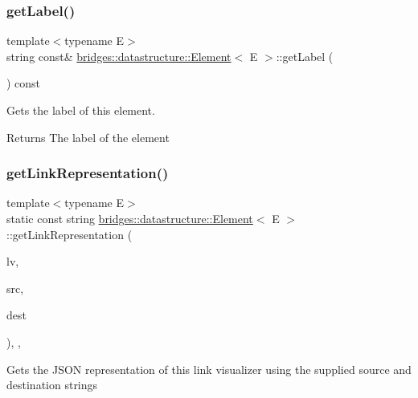 \subsubsection{\texorpdfstring{get\+Label()}{getLabel()}}
{\footnotesize\ttfamily template$<$typename E$>$ \\
string const\& \hyperlink{classbridges_1_1datastructure_1_1_element}{bridges\+::datastructure\+::\+Element}$<$ E $>$\+::get\+Label (\begin{DoxyParamCaption}{ }\end{DoxyParamCaption}) const\hspace{0.3cm}{\ttfamily [inline]}}



Gets the label of this element. 

\begin{DoxyReturn}{Returns}
The label of the element 
\end{DoxyReturn}
\mbox{\label{classbridges_1_1datastructure_1_1_element_a0d43c0aaa96192b49dfc0a499d63a325}} 
\subsubsection{\texorpdfstring{get\+Link\+Representation()}{getLinkRepresentation()}}
{\footnotesize\ttfamily template$<$typename E$>$ \\
static const string \hyperlink{classbridges_1_1datastructure_1_1_element}{bridges\+::datastructure\+::\+Element}$<$ E $>$\+::get\+Link\+Representation (\begin{DoxyParamCaption}\item[{const \hyperlink{classbridges_1_1datastructure_1_1_link_visualizer}{Link\+Visualizer} \&}]{lv,  }\item[{const string \&}]{src,  }\item[{const string \&}]{dest }\end{DoxyParamCaption})\hspace{0.3cm}{\ttfamily [inline]}, {\ttfamily [static]}, {\ttfamily [protected]}}

Gets the J\+S\+ON representation of this link visualizer using the supplied source and destination strings


